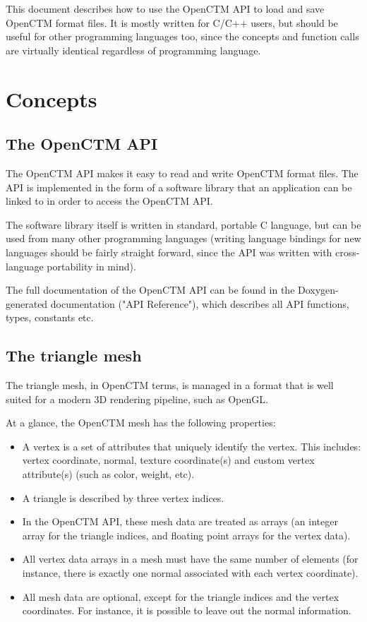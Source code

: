 This document describes how to use the OpenCTM API to load and save OpenCTM
format files. It is mostly written for C/C++ users, but should be useful for
other programming languages too, since the concepts and function calls are
virtually identical regardless of programming language.



\chapter{Concepts}

\section{The OpenCTM API}
The OpenCTM API makes it easy to read and write OpenCTM format files. The API is
implemented in the form of a software library that an application can be linked
to in order to access the OpenCTM API.

The software library itself is written in standard, portable C language, but
can be used from many other programming languages (writing language bindings
for new languages should be fairly straight forward, since the API was written
with cross-language portability in mind).

The full documentation of the OpenCTM API can be found in the Doxygen-generated
documentation ("API Reference"), which describes all API functions, types,
constants etc.


\section{The triangle mesh}
The triangle mesh, in OpenCTM terms, is managed in a format that is well suited
for a modern 3D rendering pipeline, such as OpenGL.

At a glance, the OpenCTM mesh has the following properties:

\begin{itemize}
    \item A vertex is a set of attributes that uniquely identify the vertex.
          This includes: vertex coordinate, normal, texture coordinate(s) and
          custom vertex attribute(s) (such as color, weight, etc).
    \item A triangle is described by three vertex indices.
    \item In the OpenCTM API, these mesh data are treated as arrays (an integer
          array for the triangle indices, and floating point arrays for the
          vertex data).
    \item All vertex data arrays in a mesh must have the same number of elements
          (for instance, there is exactly one normal associated with each
          vertex coordinate).
    \item All mesh data are optional, except for the triangle indices and the
          vertex coordinates. For instance, it is possible to leave out the
          normal information.
\end{itemize}

